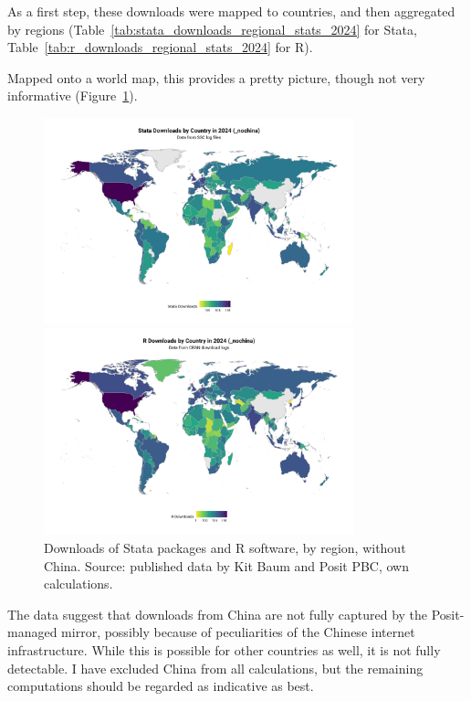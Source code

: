 \documentclass{article}
\begin{document}
As a first step, these downloads were mapped to countries, and then aggregated by regions (Table~\ref{tab:stata_downloads_regional_stats_2024} for Stata, Table~\ref{tab:r_downloads_regional_stats_2024} for R).
%
%


%
Mapped onto a world map, this provides a pretty picture, though not very informative (Figure~\ref{fig:stata_r_world}).
\begin{figure}
    \centering
    \includegraphics[width=0.8\textwidth]{outputs/stata_downloads_world_map_2024_nochina.png}

    \includegraphics[width=0.8\textwidth]{outputs/r_downloads_world_map_2024_nochina.png}
    \caption{Downloads of Stata packages and R software, by region, without China. Source: published data by Kit Baum and Posit PBC, own calculations.}
    \label{fig:stata_r_world}
\end{figure}
The data suggest that downloads from China are not fully captured by the Posit-managed mirror, possibly because of peculiarities of the Chinese internet infrastructure. While this is possible for other countries as well, it is not fully detectable. I have excluded China from all calculations, but the remaining computations should be regarded as indicative as best. 
\end{document}
